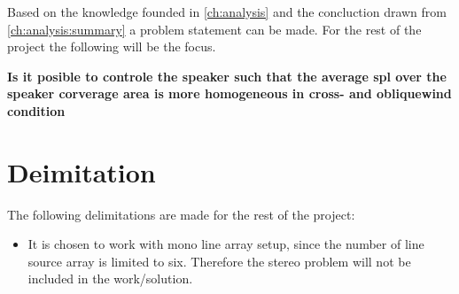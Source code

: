 Based on the knowledge founded in \autoref{ch:analysis} and the concluction drawn from \autoref{ch:analysis:summary} a problem statement can be made. For the rest of the project the following will be the focus.


\textbf{Is it posible to controle the speaker such that the average \gls{spl} over the speaker corverage area is more homogeneous in cross- and obliquewind condition}



\section{Deimitation}
The following delimitations are made for the rest of the project:

\begin{itemize}
\item It is chosen to work with mono line array setup, since the number of line source array is limited to six. Therefore the stereo problem will not be included in the work/solution.
\end{itemize}